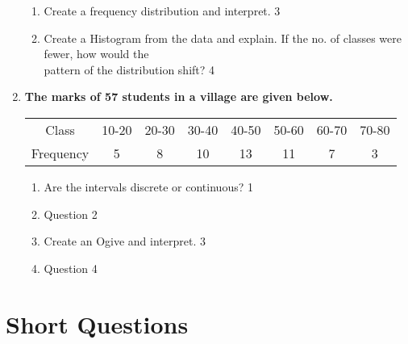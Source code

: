 \documentclass[a4paper,oneside]{book}
\begin{document}
\begin{enumerate}
  
  \begin{enumerate}
    \item  
	 Create a frequency distribution and interpret. \hfill 3
    \item
	Create a Histogram from the data and explain. If the no. of 
	classes were fewer, how would the \\ pattern of the distribution shift? \hfill 4
  \end{enumerate}
  
   \item
	  \textbf{The marks of 57 students in a village are given below.}
	  
	  \begin{table}[h]
	  \centering
\begin{tabular}{c|c|c|c|c|c|c|c}
Class     & 10-20 & 20-30 & 30-40 & 40-50 & 50-60 & 60-70 & 70-80 \\
Frequency & 5     & 8     & 10    & 13    & 11    & 7     & 3    
\end{tabular}
\end{table}
  
  \begin{enumerate}
    \item
	Are the intervals discrete or continuous? \hfill 1
    \item
	Question \hfill 2
    \item  
	Create an Ogive and interpret. \hfill 3
    \item
	Question \hfill 4
  \end{enumerate}
  
    \end{enumerate}
    
\section{Short Questions}
\end{document}

